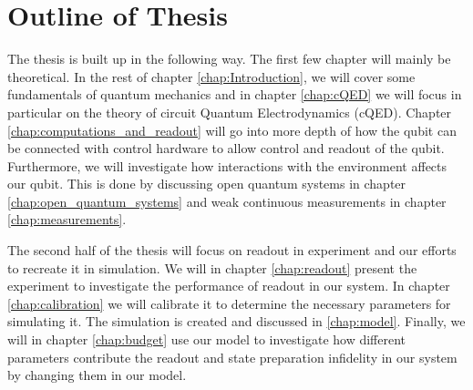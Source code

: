 


\section{Outline of Thesis}
The thesis is built up in the following way. The first few chapter will mainly be theoretical. In the rest of chapter \ref{chap:Introduction}, we will cover some fundamentals of quantum mechanics and in chapter \ref{chap:cQED} we will focus in particular on the theory of circuit Quantum Electrodynamics (cQED). Chapter \ref{chap:computations_and_readout} will go into more depth of how the qubit can be connected with control hardware to allow control and readout of the qubit. Furthermore, we will investigate how interactions with the environment affects our qubit. This is done by discussing open quantum systems in chapter \ref{chap:open_quantum_systems} and weak continuous measurements in chapter \ref{chap:measurements}.

The second half of the thesis will focus on readout in experiment and our efforts to recreate it in simulation. We will in chapter \ref{chap:readout} present the experiment to investigate the performance of readout in our system. In chapter \ref{chap:calibration} we will calibrate it to determine the necessary parameters for simulating it. The simulation is created and discussed in \ref{chap:model}. Finally, we will in chapter \ref{chap:budget} use our model to investigate how different parameters contribute the readout and state preparation infidelity in our system by changing them in our model.  



